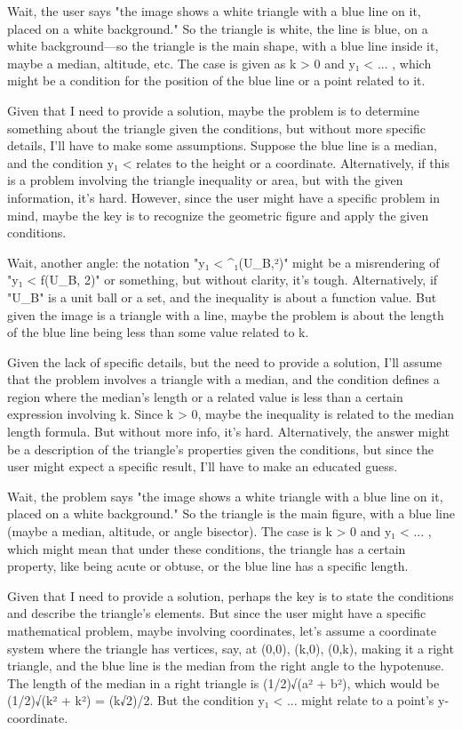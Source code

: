 Wait, the user says "the image shows a white triangle with a blue line on it, placed on a white background." So the triangle is white, the line is blue, on a white background—so the triangle is the main shape, with a blue line inside it, maybe a median, altitude, etc. The case is given as k > 0 and y₁ < ... , which might be a condition for the position of the blue line or a point related to it.

Given that I need to provide a solution, maybe the problem is to determine something about the triangle given the conditions, but without more specific details, I'll have to make some assumptions. Suppose the blue line is a median, and the condition y₁ < relates to the height or a coordinate. Alternatively, if this is a problem involving the triangle inequality or area, but with the given information, it's hard. However, since the user might have a specific problem in mind, maybe the key is to recognize the geometric figure and apply the given conditions.

Wait, another angle: the notation "y₁ < ^₁(U_B,²)" might be a misrendering of "y₁ < f(U_B, 2)" or something, but without clarity, it's tough. Alternatively, if "U_B" is a unit ball or a set, and the inequality is about a function value. But given the image is a triangle with a line, maybe the problem is about the length of the blue line being less than some value related to k.

Given the lack of specific details, but the need to provide a solution, I'll assume that the problem involves a triangle with a median, and the condition defines a region where the median's length or a related value is less than a certain expression involving k. Since k > 0, maybe the inequality is related to the median length formula. But without more info, it's hard. Alternatively, the answer might be a description of the triangle's properties given the conditions, but since the user might expect a specific result, I'll have to make an educated guess.

Wait, the problem says "the image shows a white triangle with a blue line on it, placed on a white background." So the triangle is the main figure, with a blue line (maybe a median, altitude, or angle bisector). The case is k > 0 and y₁ < ... , which might mean that under these conditions, the triangle has a certain property, like being acute or obtuse, or the blue line has a specific length.

Given that I need to provide a solution, perhaps the key is to state the conditions and describe the triangle's elements. But since the user might have a specific mathematical problem, maybe involving coordinates, let's assume a coordinate system where the triangle has vertices, say, at (0,0), (k,0), (0,k), making it a right triangle, and the blue line is the median from the right angle to the hypotenuse. The length of the median in a right triangle is (1/2)√(a² + b²), which would be (1/2)√(k² + k²) = (k√2)/2. But the condition y₁ < ... might relate to a point's y-coordinate.

